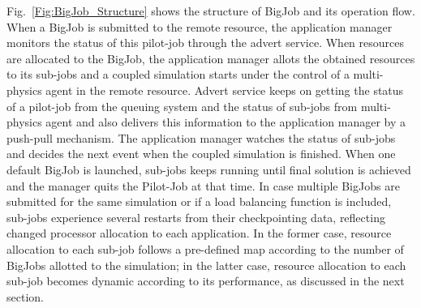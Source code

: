 \documentclass[conference,final]{IEEEtran}
\newcommand{\skonote}[1]{ {\textcolor{blue} { ***Jeff: #1 }}}
\newcommand{\skonote}[1]{}
\begin{document}


Fig.~\ref{Fig:BigJob_Structure} shows the structure of BigJob and its
operation flow. When a BigJob is submitted to the remote resource, the
application manager monitors the status of this pilot-job through the
advert service. When resources are allocated to the BigJob, the
application manager allots the obtained resources to its sub-jobs and a
coupled simulation starts under the control of a multi-physics agent
in the remote resource. Advert service keeps on getting the status of
a pilot-job from the queuing system and the status of sub-jobs from
multi-physics agent and also delivers this information to the
application manager by a push-pull mechanism. The application manager
watches the status of sub-jobs and decides the next event when the
coupled simulation is finished. When one default BigJob is launched,
sub-jobs keeps running until final solution is achieved and the
manager quits the Pilot-Job at that time. In case multiple BigJobs
are submitted for the same simulation or if a load balancing function is
included, sub-jobs experience several restarts from their
checkpointing data, reflecting changed processor allocation to each
application. In the former case, resource allocation to each sub-job
follows a pre-defined map according to the number of BigJobs allotted
to the simulation; in the latter case, resource allocation to each
sub-job becomes dynamic according to its performance, as discussed
in the next section.
\end{document}
